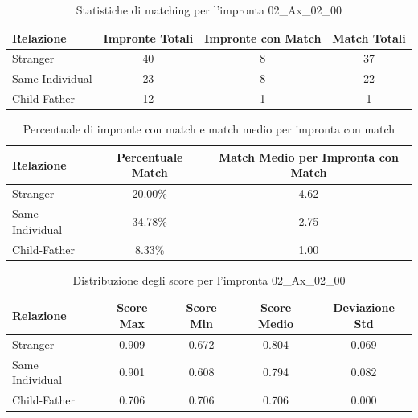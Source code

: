 \begin{table}[htbp]
\centering
\caption{Statistiche di matching per l'impronta 02\_Ax\_02\_00}
\label{tab:results_02_Ax_02_00}
\begin{tabular}{|l|c|c|c|}
\hline
\textbf{Relazione} & \textbf{Impronte Totali} & \textbf{Impronte con Match} & \textbf{Match Totali} \\
\hline
Stranger & 40 & 8 & 37 \\
\hline
Same Individual & 23 & 8 & 22 \\
\hline
Child-Father & 12 & 1 & 1 \\
\hline
\end{tabular}
\end{table}


\begin{table}[htbp]
\centering
\caption{Percentuale di impronte con match e match medio per impronta con match}
\label{tab:match_percentage_02_Ax_02_00}
\begin{tabular}{|l|c|c|}
\hline
\textbf{Relazione} & \textbf{Percentuale Match} & \textbf{Match Medio per Impronta con Match} \\
\hline
Stranger & 20.00\% & 4.62 \\
\hline
Same Individual & 34.78\% & 2.75 \\
\hline
Child-Father & 8.33\% & 1.00 \\
\hline
\end{tabular}
\end{table}


\begin{table}[htbp]
\centering
\caption{Distribuzione degli score per l'impronta 02\_Ax\_02\_00}
\label{tab:scores_02_Ax_02_00}
\begin{tabular}{|l|c|c|c|c|}
\hline
\textbf{Relazione} & \textbf{Score Max} & \textbf{Score Min} & \textbf{Score Medio} & \textbf{Deviazione Std} \\
\hline
Stranger & 0.909 & 0.672 & 0.804 & 0.069 \\
\hline
Same Individual & 0.901 & 0.608 & 0.794 & 0.082 \\
\hline
Child-Father & 0.706 & 0.706 & 0.706 & 0.000 \\
\hline
\end{tabular}
\end{table}

